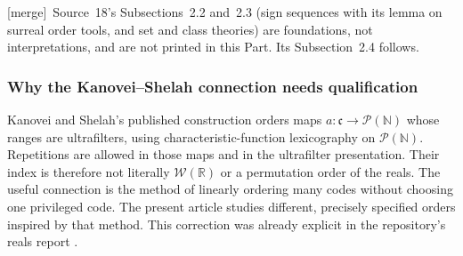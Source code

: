 \documentclass[11pt]{article}
\theoremstyle{definition}
\theoremstyle{remark}
\newcommand{\WO}{\mathcal W}
\newcommand{\merge}{\textsf{[merge]}}
\begin{document}
\merge\ Source~18's Subsections~2.2 and~2.3 (sign sequences with its lemma
on surreal order tools, and set and class theories) are foundations, not
interpretations, and are not printed in this Part. Its Subsection~2.4
follows.

\subsubsection{Why the Kanovei--Shelah connection needs qualification}

Kanovei and Shelah's published construction \cite[\S2]{KanoveiShelah}
orders maps $a:\mathfrak c\to\mathcal P(\mathbb N)$ whose ranges are
ultrafilters, using characteristic-function lexicography on
$\mathcal P(\mathbb N)$. Repetitions are allowed in those maps and in
the ultrafilter presentation. Their index is therefore not literally
$\WO(\mathbb R)$ or a permutation order of the reals. The useful
connection is the method of linearly ordering many codes without
choosing one privileged code. The present article studies different,
precisely specified orders inspired by that method. This correction
was already explicit in the repository's reals report \cite{ProveItReals}.
\end{document}
